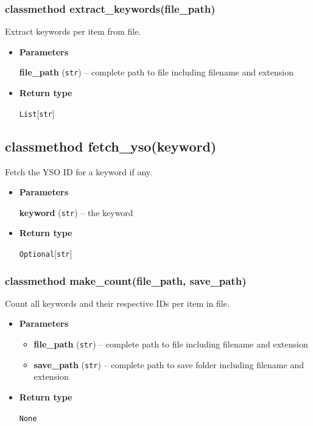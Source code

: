 \hypertarget{classmethod-extract_keywordsfile_path}{%
\subsubsection{classmethod
extract\_keywords(file\_path)}\label{classmethod-extract_keywordsfile_path}}

Extract keywords per item from file.

\begin{itemize}
\item
  \textbf{Parameters}

  \textbf{file\_path} (\texttt{str}) -- complete path to file including
  filename and extension
\item
  \textbf{Return type}

  \texttt{List}{[}\texttt{str}{]}
\end{itemize}

\hypertarget{classmethod-fetch_ysokeyword}{%
\subsection{classmethod
fetch\_yso(keyword)}\label{classmethod-fetch_ysokeyword}}

Fetch the YSO ID for a keyword if any.

\begin{itemize}
\item
  \textbf{Parameters}

  \textbf{keyword} (\texttt{str}) -- the keyword
\item
  \textbf{Return type}

  \texttt{Optional}{[}\texttt{str}{]}
\end{itemize}

\hypertarget{classmethod-make_countfile_path-save_path}{%
\subsubsection{classmethod make\_count(file\_path,
save\_path)}\label{classmethod-make_countfile_path-save_path}}

Count all keywords and their respective IDs per item in file.

\begin{itemize}
\item
  \textbf{Parameters}

  \begin{itemize}
  \item
    \textbf{file\_path} (\texttt{str}) -- complete path to file
    including filename and extension
  \item
    \textbf{save\_path} (\texttt{str}) -- complete path to save folder
    including filename and extension
  \end{itemize}
\item
  \textbf{Return type}

  \texttt{None}
\end{itemize}

